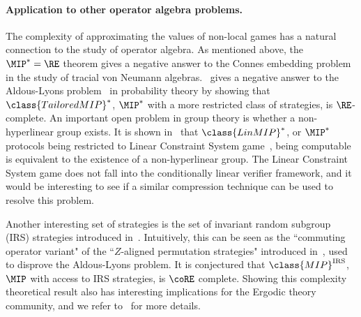 \paragraph{Application to other operator algebra problems. } The complexity of approximating the values of non-local games has a natural connection to the study of operator algebra. As mentioned above, the $\MIP^*=\RE$ theorem gives a negative answer to the Connes embedding problem in the study of tracial von Neumann algebras.~\cite{bowenAldousLyonsConjectureSubgroup2024, bowenAldousLyonsConjectureII2024} gives a negative answer to the Aldous-Lyons problem~\cite{aldousProcessesUnimodularRandom2018} in probability theory by showing that $\class{TailoredMIP}^*$, $\MIP^*$ with a more restricted class of strategies, is $\RE$-complete. An important open problem in group theory is whether a non-hyperlinear group exists. It is shown in~\cite{paddockSatisfiabilityProblemsAlgebras2025} that $\class{LinMIP}^*$, or $\MIP^*$ protocols being restricted to Linear Constraint System game~\cite{cleveCharacterizationBinaryConstraint2014,kimSynchronousGameBinary2018}, being computable is equivalent to the existence of a non-hyperlinear group. The Linear Constraint System game does not fall into the conditionally linear verifier framework, and it would be interesting to see if a similar compression technique can be used to resolve this problem. 

Another interesting set of strategies is the set of invariant random subgroup (IRS) strategies introduced in~\cite{manzoorThereEquivalenceRelation2025}. Intuitively, this can be seen as the ``commuting operator variant" of the ``$Z$-aligned permutation strategies" introduced in~\cite{bowenAldousLyonsConjectureSubgroup2024}, used to disprove the Aldous-Lyons problem. It is conjectured that $\class{MIP}^{\text{IRS}}$, $\MIP$ with access to IRS strategies, is $\coRE$ complete. Showing this complexity theoretical result also has interesting implications for the Ergodic theory community, and we refer to~\cite{manzoorInvariantRandomSubgroups2025} for more details.  



